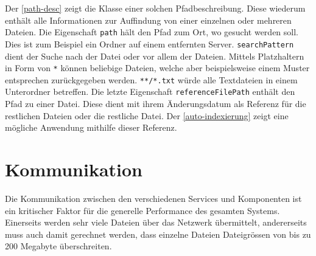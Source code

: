 
Der \autoref{path-desc} zeigt die Klasse einer solchen Pfadbeschreibung. Diese wiederum enthält alle Informationen zur Auffindung von einer einzelnen oder mehreren Dateien. Die Eigenschaft \texttt{path} hält den Pfad zum Ort, wo gesucht werden soll. Dies ist zum Beispiel ein Ordner auf einem entfernten Server. \texttt{searchPattern} dient der Suche nach der Datei oder vor allem der Dateien. Mittels Platzhaltern in Form von \texttt{*} können beliebige Dateien, welche aber beispielsweise einem Muster entsprechen zurückgegeben werden. \verb|**/*.txt| würde alle Textdateien in einem Unterordner betreffen. Die letzte Eigenschaft \texttt{referenceFilePath} enthält den Pfad zu einer Datei. Diese dient mit ihrem Änderungsdatum als Referenz für die restlichen Dateien oder die restliche Datei. Der \autoref{auto-indexierung} zeigt eine mögliche Anwendung mithilfe dieser Referenz.







\section{Kommunikation}


Die Kommunikation zwischen den verschiedenen Services und Komponenten ist ein kritischer Faktor für die generelle Performance des gesamten Systems. Einerseits werden sehr viele Dateien über das Netz\-we\-rk übermittelt, andererseits muss auch damit ge\-rech\-net werden, dass einzelne Dateien Dateigrössen von bis zu 200 Megabyte überschreiten.

